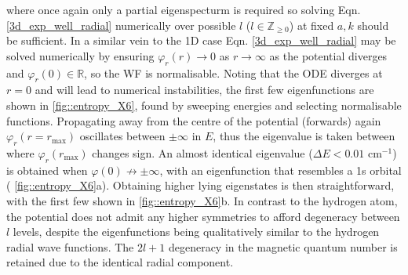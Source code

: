 \documentclass[../main.tex]{subfiles}
\begin{document}
where once again only a partial eigenspecturm is required so solving Eqn. \eqref{3d_exp_well_radial} numerically over possible $l$ ($l \in \mathbb{Z}_{\ge0}$) at fixed $a, k$ should be sufficient. In a similar vein to the 1D case Eqn. \eqref{3d_exp_well_radial} may be solved numerically by ensuring $\varphi_r(r) \rightarrow 0$ as $r \rightarrow \infty$ as the potential diverges and $\varphi_r(0) \in \mathbb{R}$, so the WF is normalisable. Noting that the ODE diverges at $r = 0$ and will lead to numerical instabilities, the first few eigenfunctions are shown in \figurename{ \ref{fig::entropy_X6}}, found by sweeping energies and selecting normalisable functions. Propagating away from the centre of the potential (forwards) again $\varphi_r(r=r_\text{max})$ oscillates between $\pm \infty$ in $E$, thus the eigenvalue is taken between where $\varphi_r(r_\text{max})$ changes sign. An almost identical eigenvalue ($\Delta E < 0.01$ cm$^{-1}$) is obtained when $\varphi(0) \nrightarrow \pm \infty$, with an eigenfunction that resembles a 1s orbital (\figurename{ \ref{fig::entropy_X6}a}). Obtaining higher lying eigenstates is then straightforward, with the first few shown in  \figurename{ \ref{fig::entropy_X6}b}. In contrast to the hydrogen atom, the potential does not admit any higher symmetries to afford degeneracy between $l$ levels, despite the eigenfunctions being qualitatively similar to the hydrogen radial wave functions. The $2l + 1$ degeneracy in the magnetic quantum number is retained due to the identical radial component. 
\vspace{0.2cm}
\end{document}
